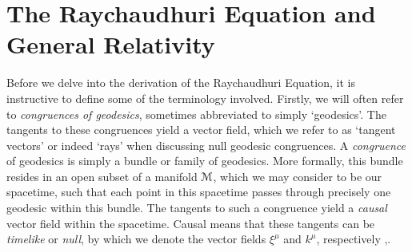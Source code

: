 \section{The Raychaudhuri Equation and General Relativity}
\label{sec:RE}
Before we delve into the derivation of the Raychaudhuri Equation, it is instructive to define some of the terminology involved. Firstly, we will often refer to \emph{congruences of geodesics}, sometimes abbreviated to simply `geodesics'. The tangents to these congruences yield a vector field, which we refer to as `tangent vectors' or indeed `rays' when discussing null geodesic congruences. A \emph{congruence} of geodesics is simply a bundle or family of geodesics. More formally, this bundle resides in an open subset of a manifold ${\cal M}$, which we may consider to be our spacetime, such that each point in this spacetime passes through precisely one geodesic within this bundle. The tangents to such a congruence yield a \emph{causal} vector field within the spacetime. Causal means that these tangents can be \emph{timelike} or \emph{null}, by which we denote the vector fields $\xi^{\mu}$ and $k^{\mu}$, respectively \cite{Wald:GR},\cite{Kar:2006ms}.

